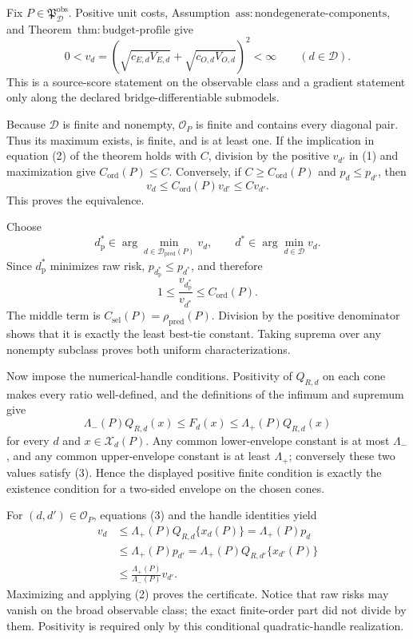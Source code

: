 Fix \(P\in\mathfrak P_{\mathcal D}^{\mathrm{obs}}\). Positive unit costs, Assumption~\(\mathrm{ass{:}nondegenerate\text{-}components}\), and Theorem~\(\mathrm{thm{:}budget\text{-}profile}\) give
\[
 0<v_d=(\sqrt{c_{E,d}V_{E,d}}+\sqrt{c_{O,d}V_{O,d}})^2<\infty
 \qquad(d\in\mathcal D). \tag{1}
\]
This is a source-score statement on the observable class and a gradient statement only along the declared bridge-differentiable submodels.

Because \(\mathcal D\) is finite and nonempty, \(\mathcal O_P\) is finite and contains every diagonal pair. Thus its maximum exists, is finite, and is at least one. If the implication in equation (2) of the theorem holds with \(C\), division by the positive \(v_{d'}\) in (1) and maximization give \(C_{\mathrm{ord}}(P)\le C\). Conversely, if \(C\ge C_{\mathrm{ord}}(P)\) and \(p_d\le p_{d'}\), then
\[
 v_d\le C_{\mathrm{ord}}(P)v_{d'}\le Cv_{d'}.
\]
This proves the equivalence.

Choose
\[
 d_{\mathrm p}^*\in\arg\min_{d\in\mathcal D_{\mathrm{pred}}(P)}v_d,
 \qquad d^*\in\arg\min_{d\in\mathcal D}v_d.
\]
Since \(d_{\mathrm p}^*\) minimizes raw risk, \(p_{d_{\mathrm p}^*}\le p_{d^*}\), and therefore
\[
 1\le\frac{v_{d_{\mathrm p}^*}}{v_{d^*}}
 \le C_{\mathrm{ord}}(P). \tag{2}
\]
The middle term is \(C_{\mathrm{sel}}(P)=\rho_{\mathrm{pred}}(P)\). Division by the positive denominator shows that it is exactly the least best-tie constant. Taking suprema over any nonempty subclass proves both uniform characterizations.

Now impose the numerical-handle conditions. Positivity of \(Q_{R,d}\) on each cone makes every ratio well-defined, and the definitions of the infimum and supremum give
\[
 \Lambda_-(P)Q_{R,d}(x)\le F_d(x)
 \le\Lambda_+(P)Q_{R,d}(x) \tag{3}
\]
for every \(d\) and \(x\in\mathcal X_d(P)\). Any common lower-envelope constant is at most \(\Lambda_-\), and any common upper-envelope constant is at least \(\Lambda_+\); conversely these two values satisfy (3). Hence the displayed positive finite condition is exactly the existence condition for a two-sided envelope on the chosen cones.

For \((d,d')\in\mathcal O_P\), equations (3) and the handle identities yield
\[
\begin{aligned}
 v_d
 &\le\Lambda_+(P)Q_{R,d}\{x_d(P)\}
 =\Lambda_+(P)p_d\\
 &\le\Lambda_+(P)p_{d'}
 =\Lambda_+(P)Q_{R,d'}\{x_{d'}(P)\}\\
 &\le\frac{\Lambda_+(P)}{\Lambda_-(P)}v_{d'}.
\end{aligned} \tag{4}
\]
Maximizing and applying (2) proves the certificate. Notice that raw risks may vanish on the broad observable class; the exact finite-order part did not divide by them. Positivity is required only by this conditional quadratic-handle realization.

